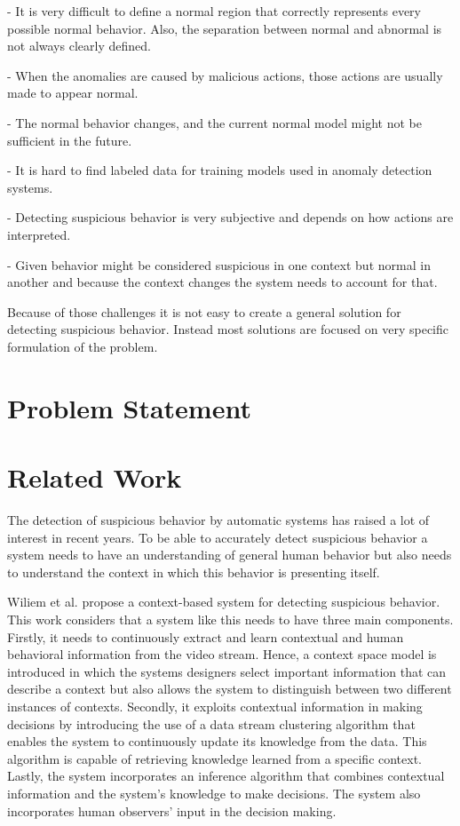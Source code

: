 - It is very difficult to define a normal region that correctly represents every possible normal behavior. Also, the separation between normal and abnormal is not always clearly defined.

- When the anomalies are caused by malicious actions, those actions are usually made to appear normal.

- The normal behavior changes, and the current normal model might not be sufficient in the future.

- It is hard to find labeled data for training models used in anomaly detection systems.

- Detecting suspicious behavior is very subjective and depends on how actions are interpreted.

- Given behavior might be considered suspicious in one context but normal in another and because the context changes the system needs to account for that.

Because of those challenges it is not easy to create a general solution for detecting suspicious behavior. Instead most solutions are focused on very specific formulation of the problem.


\section{Problem Statement}




\section{Related Work}

The detection of suspicious behavior by automatic systems has raised a lot of interest in recent years. To be able to accurately detect suspicious behavior a system needs to have an understanding of general human behavior but also needs to understand the context in which this behavior is presenting itself.

Wiliem et al. \cite{n1} propose a context-based system for detecting suspicious behavior. This work considers that a system like this needs to have three main components. Firstly, it needs to continuously extract and learn contextual and human behavioral information from the video stream. Hence, a context space model is introduced in which the systems designers select important information that can describe a context but also allows the system to distinguish between two different instances of contexts. Secondly, it exploits contextual information in making decisions by introducing the use of a data stream clustering algorithm that enables the system to continuously update its knowledge from the data. This algorithm is capable of retrieving knowledge learned from a specific context. Lastly, the system incorporates an inference algorithm that combines contextual information and the system's knowledge to make decisions. The system also incorporates human observers' input in the decision making.

